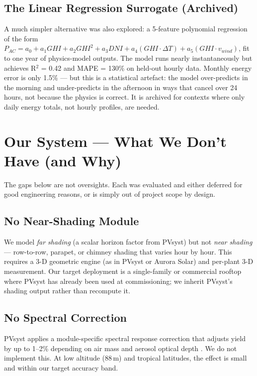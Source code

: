 \documentclass[11pt, a4paper]{article}
\newcommand{\kw}[1]{\textit{#1}}
\begin{document}
\subsection{The Linear Regression Surrogate (Archived)}

A much simpler alternative was also explored: a 5-feature polynomial
regression of the form
$P_{AC} = a_0 + a_1 GHI + a_2 GHI^2 + a_3 DNI
+ a_4 (GHI \cdot \Delta T) + a_5 (GHI \cdot v_{wind})$,
fit to one year of physics-model outputs. The model runs nearly instantaneously
but achieves R$^2$ = 0.42 and MAPE = 130\% on held-out hourly data. Monthly
energy error is only 1.5\% --- but this is a statistical artefact: the
model over-predicts in the morning and under-predicts in the afternoon in
ways that cancel over 24 hours, not because the physics is correct.
It is archived for contexts where only daily energy totals, not hourly
profiles, are needed.

\section{Our System --- What We Don't Have (and Why)}

\begin{gapbox}
The gaps below are not oversights. Each was evaluated and either deferred for
good engineering reasons, or is simply out of project scope by design.
\end{gapbox}

\subsection{No Near-Shading Module}
We model \kw{far shading} (a scalar horizon factor from PVsyst) but not
\kw{near shading} --- row-to-row, parapet, or chimney shading that varies hour
by hour. This requires a 3-D geometric engine (as in PVsyst or Aurora Solar)
and per-plant 3-D measurement. Our target deployment is a single-family or
commercial rooftop where PVsyst has already been used at commissioning; we
inherit PVsyst's shading output rather than recompute it.

\subsection{No Spectral Correction}
PVsyst applies a module-specific spectral response correction that adjusts
yield by up to 1--2\% depending on air mass and aerosol optical depth
\cite{wright2020spectral}. We do not implement this. At low altitude (88\,m)
and tropical latitudes, the effect is small and within our target accuracy band.
\end{document}
